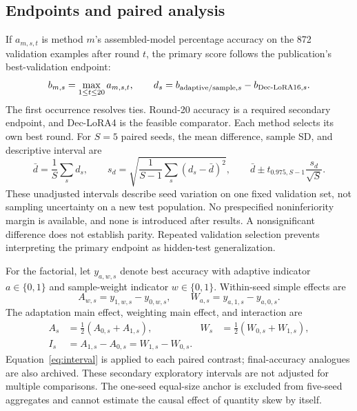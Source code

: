 \documentclass[11pt]{article}
\begin{document}
\subsection{Endpoints and paired analysis}
If $a_{m,s,t}$ is method $m$'s assembled-model percentage accuracy on the 872 validation examples after round $t$, the primary score follows the publication's best-validation endpoint:
\begin{equation}
 b_{m,s}=\max_{1\le t\le20}a_{m,s,t},\qquad
 d_s=b_{{\rm adaptive/sample},s}-b_{{\rm Dec\text{-}LoRA16},s}.
 \label{eq:endpoint}
\end{equation}
The first occurrence resolves ties. Round-20 accuracy is a required secondary endpoint, and Dec-LoRA4 is the feasible comparator. Each method selects its own best round. For $S=5$ paired seeds, the mean difference, sample SD, and descriptive interval are
\begin{equation}
 \bar d=\frac1S\sum_sd_s,\qquad
 s_d=\sqrt{\frac1{S-1}\sum_s(d_s-\bar d)^2},\qquad
 \bar d\pm t_{0.975,S-1}\frac{s_d}{\sqrt S}.
 \label{eq:interval}
\end{equation}
These unadjusted intervals describe seed variation on one fixed validation set, not sampling uncertainty on a new test population. No prespecified noninferiority margin is available, and none is introduced after results. A nonsignificant difference does not establish parity. Repeated validation selection prevents interpreting the primary endpoint as hidden-test generalization.

For the factorial, let $y_{a,w,s}$ denote best accuracy with adaptive indicator $a\in\{0,1\}$ and sample-weight indicator $w\in\{0,1\}$. Within-seed simple effects are
\begin{equation}
 A_{w,s}=y_{1,w,s}-y_{0,w,s},\qquad
 W_{a,s}=y_{a,1,s}-y_{a,0,s}.
\end{equation}
The adaptation main effect, weighting main effect, and interaction are
\begin{align}
 A_s&=\tfrac12(A_{0,s}+A_{1,s}),& W_s&=\tfrac12(W_{0,s}+W_{1,s}),\\
 I_s&=A_{1,s}-A_{0,s}=W_{1,s}-W_{0,s}.
 \label{eq:factorial}
\end{align}
Equation~\eqref{eq:interval} is applied to each paired contrast; final-accuracy analogues are also archived. These secondary exploratory intervals are not adjusted for multiple comparisons. The one-seed equal-size anchor is excluded from five-seed aggregates and cannot estimate the causal effect of quantity skew by itself.
\end{document}
